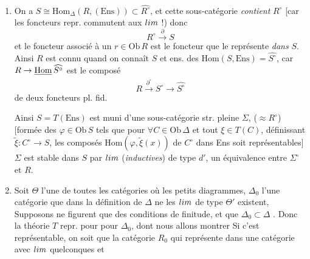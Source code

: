 \documentclass[11pt,a4paper]{article}
\begin{document}
\begin{enumerate}
  \item[3°)] On a $S \cong \mathrm{Hom}_{\Delta}(R, (\mathrm{Ens}))
    \subset \widehat{R^{\circ}}$, et cette sous-catégorie
    \emph{contient} $R^{\circ}$ [car les foncteurs repr. 
    commutent aux $\varprojlim$ !) donc
    \[
      \boxed{\ R^{\circ} \xrightarrow{\ \partial\ } S\ }
    \]
    et le foncteur  associé à
    un $r \in \mathrm{Ob}\,R$ est le foncteur que le représente
    \emph{dans} $S$. Ainsi $R$ est connu quand on connaît $S$ et
     ens. des $\mathrm{Hom}(S, \mathrm{Ens}) =
    \widehat{S^{\circ}}$, car $R \to \struck{\mathrm{Hom}}\,
    \widehat{S^{\circ}}$ est le composé
    \[
      R \xrightarrow{\ \partial^{\circ}\ } S^{\circ} \longrightarrow
      \widehat{S^{\circ}}
    \]
    de deux foncteurs pl. fid.

    Ainsi $S = T(\mathrm{Ens})$ est muni d'une sous-catégorie str. pleine
    $\Sigma$, ($\approx R^{\circ}$) [formée des $\varphi \in
    \mathrm{Ob}\,S$ tels que pour $\forall C \in \mathrm{Ob}\,\Delta$ et
    tout $\xi \in T(C)$, définissant $\tilde{\xi} : C^{\circ} \to S$,
    les composés $\mathrm{Hom}(\varphi, \tilde{\xi}(x))$  de $C^{\circ}$ dans Ens soit représentables]  $\Sigma$ est stable dans $S$ par $\varinjlim$
    (\emph{inductives}) de type $d'$,  \ill{} un équivalence  entre
    $\Sigma^{\circ}$ et $R$.
  \item[4°)] Soit \struck{\ill{}} $\Theta$ l'une de toutes les
    catégories où les \ill{} petits diagrammes, $\Delta_{0}$ l'une
    \ill{} catégorie \ill{}
    que dans la définition de $\Delta$ ne \ill{} les $\varprojlim$ de
    type $\Theta'$ existent, Supposons ne figurent que des conditions de
    finitude, et  que $\Delta_{0} \subset \Delta$
    . Donc la théorie $T$  repr. pour
    \struck{\ill{}} pour $\Delta_{0}$, dont nous allons montrer
     Si c'est
    représentable, on 
    soit que la catégorie $R_{0}$ qui représente dans une catégorie avec
    $\varinjlim$  quelconques \struck{\ill{}} et
\end{enumerate}
\end{document}
